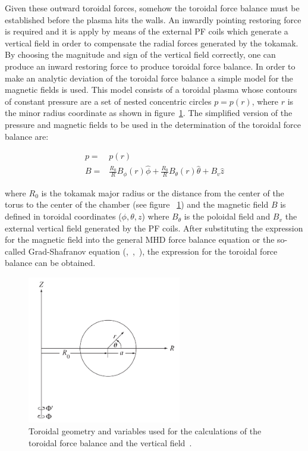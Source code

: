 Given these outward toroidal forces, somehow the  toroidal force balance must be established before the plasma hits the walls. An inwardly pointing restoring force is required and it is apply by means of the external PF coils which generate a vertical field in order to compensate the radial forces generated by the tokamak.  By choosing the magnitude and sign of the vertical field correctly, one can produce an inward restoring force to produce toroidal force balance. In order to make an analytic deviation of the toroidal force balance a simple model for the magnetic fields is used. This model consists of a toroidal plasma whose contours of constant pressure are a set of nested concentric circles $p=p(r)$, where $r$ is the minor radius coordinate as shown in figure~\ref{tor_geo}. The simplified version of the pressure and magnetic fields to be used in the determination of the toroidal force balance are:

	\begin{equation}
	\begin{aligned}
	p=&p(r)\\
	B =& \frac{R_0}{R}B_{\phi}(r) \hat{\phi} + \frac{R_0}{R}B_{\theta}(r)\hat{\theta}+B_v \hat{z}
	\end{aligned}
	\end{equation}
	
where $R_0$ is the tokamak major radius or the distance from the center of the torus to the center of the chamber (see figure ~\ref{tor_geo}) and the magnetic field $B$ is defined in toroidal coordinates ($\phi,\theta,z$) where $B_{\theta}$ is the poloidal field and $B_v$ the external vertical field generated by the PF coils. After substituting the expression for the magnetic field into the general MHD force balance equation or the so-called Grad-Shafranov equation (\cite[Chapter~6]{Miyamoto2011},~\cite[Chapter~11]{Freidberg2007},~\cite[Chpater~2]{Zohm2015}), the expression for the toroidal force balance can be obtained.
\smallskip

\begin{figure}
	\centering
	\includegraphics[width=0.6\textwidth]{Chp1/toroidal_geo.png}
	\caption{  Toroidal geometry and variables used for the calculations of the toroidal force balance and the vertical field~\cite[Chapter~11]{Freidberg2007}.\label{tor_geo}}
\end{figure}


